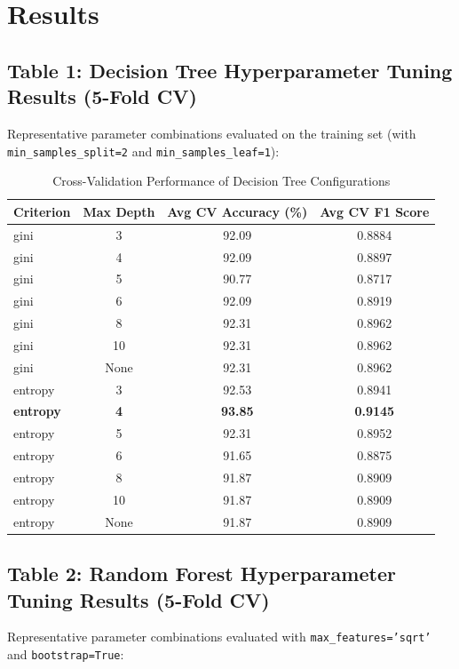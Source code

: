 \documentclass[12pt,a4paper]{article}
\begin{document}
\section{Results}

\subsection*{Table 1: Decision Tree Hyperparameter Tuning Results (5-Fold CV)}
Representative parameter combinations evaluated on the training set (with \texttt{min\_samples\_split=2} and \texttt{min\_samples\_leaf=1}):

\begin{table}[H]
\centering
\begin{tabular}{lccc}
\toprule
\textbf{Criterion} & \textbf{Max Depth} & \textbf{Avg CV Accuracy (\%)} & \textbf{Avg CV F1 Score} \\
\midrule
gini & 3 & 92.09 & 0.8884 \\
gini & 4 & 92.09 & 0.8897 \\
gini & 5 & 90.77 & 0.8717 \\
gini & 6 & 92.09 & 0.8919 \\
gini & 8 & 92.31 & 0.8962 \\
gini & 10 & 92.31 & 0.8962 \\
gini & None & 92.31 & 0.8962 \\
\midrule
entropy & 3 & 92.53 & 0.8941 \\
\textbf{entropy} & \textbf{4} & \textbf{93.85} & \textbf{0.9145} \\
entropy & 5 & 92.31 & 0.8952 \\
entropy & 6 & 91.65 & 0.8875 \\
entropy & 8 & 91.87 & 0.8909 \\
entropy & 10 & 91.87 & 0.8909 \\
entropy & None & 91.87 & 0.8909 \\
\bottomrule
\end{tabular}
\caption{Cross-Validation Performance of Decision Tree Configurations}
\label{tab:exp5_dt_tuning}
\end{table}

\subsection*{Table 2: Random Forest Hyperparameter Tuning Results (5-Fold CV)}
Representative parameter combinations evaluated with \texttt{max\_features='sqrt'} and \texttt{bootstrap=True}:
\end{document}

